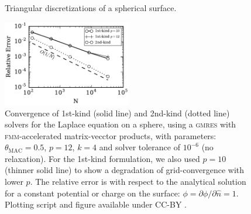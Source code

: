 \documentclass[final,3p,times]{elsarticle}
\newcommand{\fmm}{\textsc{fmm}\xspace}
\newcommand{\gmres}{\textsc{gmres}\xspace}
\newcommand{\partialdi}[2]{\partial #1 / \partial #2}
\newcommand{\nhat}{\hat{n}}
\begin{document}
\begin{figure}%
\begin{center}
	\qquad
	\caption{Triangular discretizations of a spherical surface.}
	\label{fig:glob_spheres}
\end{center}
\end{figure}
%
\begin{figure}[t]
\begin{center}
	\includegraphics[natwidth=3in,natheight=2in,width=0.5\textwidth]{LaplaceConvergence.pdf}
	\caption{Convergence of 1st-kind (solid line) and 2nd-kind (dotted line) solvers for the Laplace equation on a sphere, using a \gmres with \fmm-accelerated matrix-vecctor products, with parameters: $\theta_{\text{MAC}} = 0.5$, $p=12$, $k=4$ and solver tolerance of $10^{-6}$ (no relaxation). For the 1st-kind formulation, we also used $p=10$ (thinner solid line) to show a degradation of grid-convergence with lower $p$. The relative error is with respect to the analytical solution for a constant potential or charge on the surface: $\phi = \partialdi{\phi}{\nhat} = 1$. Plotting script and figure available under CC-BY \cite{WangLaytonBarba2016-figshare2}.}
	\label{fig:laplaceconvergence}
\end{center}
\end{figure}
\end{document}
